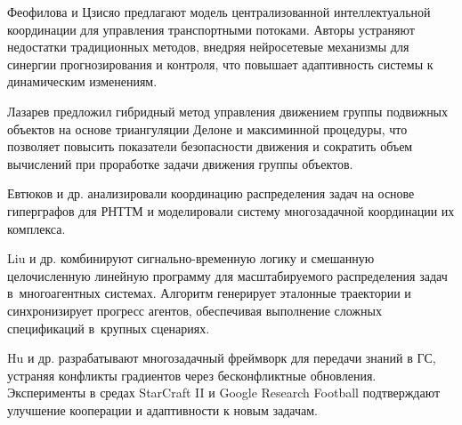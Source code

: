 Феофилова и Цзисяо \cite{FeofilovaZsisyao2024} предлагают модель централизованной интеллектуальной координации для управления транспортными потоками. Авторы устраняют недостатки традиционных методов, внедряя нейросетевые механизмы для синергии прогнозирования и контроля, что повышает адаптивность системы к динамическим изменениям.

Лазарев \cite{Lazarev2024} предложил гибридный метод управления движением группы подвижных объектов на основе триангуляции Делоне и максиминной процедуры, что позволяет повысить показатели безопасности движения и сократить объем вычислений при проработке задачи движения группы объектов.

Евтюков и др. \cite{vakbib1, confbib2, vakbib2} анализировали координацию распределения задач на основе гиперграфов для РНТТМ и моделировали систему многозадачной координации их комплекса.

Liu и др. \cite{liu2025scalablemultirobottaskallocation} комбинируют сигнально-временную логику и смешанную целочисленную линейную программу для масштабируемого распределения задач в~многоагентных системах. Алгоритм генерирует эталонные траектории и синхронизирует прогресс агентов, обеспечивая выполнение сложных спецификаций в~крупных сценариях.

Hu и др. \cite{app15042216_2025} разрабатывают многозадачный фреймворк для передачи знаний в ГС, устраняя конфликты градиентов через бесконфликтные обновления. Эксперименты в средах StarCraft II и Google Research Football подтверждают улучшение кооперации и адаптивности к новым задачам.